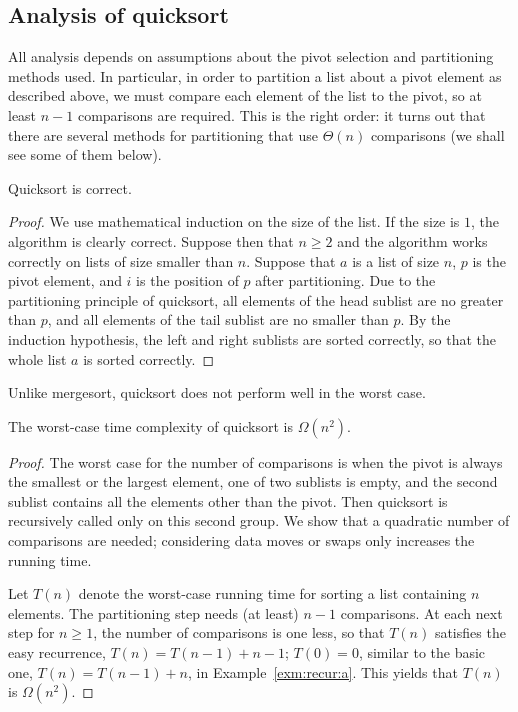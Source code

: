 \subsection*{Analysis of quicksort}

All analysis depends on assumptions about the pivot selection and partitioning 
methods used. In particular, in order to partition a list about a pivot element
as described above, we must compare each element of the list to the 
pivot, so at least $n-1$ comparisons are required. This is the right order: 
it turns out that there are several methods for partitioning that use 
$\Theta(n)$ comparisons (we shall see some of them below).

\begin{Lemma} 
Quicksort is correct.
\end{Lemma}
\begin{proof}
We use mathematical induction on the size of the list. If the size
is $1$, the algorithm is clearly correct. Suppose then that $n\geq 2$
and the algorithm works correctly on lists of size smaller than $n$. Suppose
that $a$ is a list of size $n$, $p$ is the pivot element, and $i$ is the
position of $p$ after partitioning. Due to the partitioning principle of 
quicksort, all elements of the head sublist are no greater than $p$, and all 
elements of the tail sublist are no smaller than $p$. By the induction hypothesis, 
the left and right sublists are sorted correctly, so that the whole list $a$
is sorted correctly.
\end{proof}

Unlike mergesort, quicksort does not perform well in the worst case.

\begin{Lemma}\label{lem:qsort:max} 
The worst-case time complexity of quicksort is \(\Omega(n^2 )\).
\end{Lemma}

\begin{proof}
The worst case for the number of comparisons is when the pivot is always the 
smallest or the largest element, one of two sublists is empty, and the second 
sublist contains all the elements other than the pivot. Then quicksort is 
recursively called only on this second group. We show that a quadratic number 
of comparisons are needed; considering data moves or swaps only increases the 
running time.

Let $T(n)$ denote the worst-case running time for sorting a list containing 
$n$ elements. The partitioning step needs (at least) $n-1$ comparisons. 
At each next step for $n \ge 1$, the number of comparisons is one less, so that
 \(T(n)\) satisfies the easy recurrence, 
\(T(n) = T(n-1) + n-1\); \(T(0)=0\), similar to the basic one, 
\(T(n)=T(n-1)+n\), in Example~\ref{exm:recur:a}. This yields that 
\(T(n)\) is $\Omega(n^{2})$. 
\end{proof}

